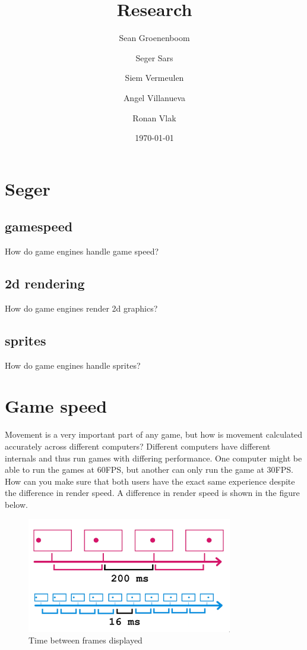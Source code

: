 \documentclass{article} %
\title{Research} %
\author{Sean Groenenboom \and Seger Sars \and Siem Vermeulen \and Angel Villanueva \and Ronan Vlak} %
\date{\today} %
\begin{document}
\maketitle %
\newpage

\tableofcontents %
\newpage

\section{Seger}

\subsection{gamespeed}
How do game engines handle game speed?
\subsection{2d rendering}
How do game engines render 2d graphics?
\subsection{sprites}
How do game engines handle sprites?
\newpage
\section{Game speed}
Movement is a very important part of any game, but how is movement calculated accurately across different computers?
Different computers have different internals and thus run games with differing performance.
One computer might be able to run the games at 60FPS, but another can only run the game at 30FPS.
How can you make sure that both users have the exact same experience despite the difference in render speed.
A difference in render speed is shown in the figure below.
\begin{figure}[h!]
    \centering
    \includegraphics[width=0.8\textwidth]{time_between_frames.png}
    \caption{Time between frames displayed}
\end{figure}
\end{document}
